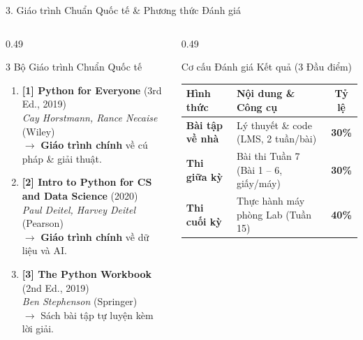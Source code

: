 \documentclass[aspectratio=169, 10pt]{beamer}
\begin{document}
\begin{frame}{3. Giáo trình Chuẩn Quốc tế \& Phương thức Đánh giá}
  \begin{columns}[T]
    \begin{column}{0.49\textwidth}
      \begin{cbox}[primaryblue]{3 Bộ Giáo trình Chuẩn Quốc tế}
        \footnotesize
        \begin{enumerate}\setlength{\itemsep}{3pt}
          \item \textbf{[1] Python for Everyone} (3rd Ed., 2019)\\
          \textit{Cay Horstmann, Rance Necaise} (Wiley)\\
          $\rightarrow$ \textbf{Giáo trình chính} về cú pháp \& giải thuật.
          \item \textbf{[2] Intro to Python for CS and Data Science} (2020)\\
          \textit{Paul Deitel, Harvey Deitel} (Pearson)\\
          $\rightarrow$ \textbf{Giáo trình chính} về dữ liệu và AI.
          \item \textbf{[3] The Python Workbook} (2nd Ed., 2019)\\
          \textit{Ben Stephenson} (Springer)\\
          $\rightarrow$ Sách bài tập tự luyện kèm lời giải.
        \end{enumerate}
      \end{cbox}
    \end{column}
    \begin{column}{0.49\textwidth}
      \begin{cbox}[secondarygreen]{Cơ cấu Đánh giá Kết quả (3 Đầu điểm)}
        \scriptsize
        \begin{tabularx}{\textwidth}{lX c}
          \toprule
          \textbf{Hình thức} & \textbf{Nội dung \& Công cụ} & \textbf{Tỷ lệ} \\
          \midrule
          \textbf{Bài tập về nhà} & Lý thuyết \& code (LMS, 2 tuần/bài) & \textbf{30\%} \\
          \textbf{Thi giữa kỳ} & Bài thi Tuần 7 (Bài 1 -- 6, giấy/máy) & \textbf{30\%} \\
          \textbf{Thi cuối kỳ} & Thực hành máy phòng Lab (Tuần 15) & \textbf{40\%} \\
          \bottomrule
        \end{tabularx}
      \end{cbox}
      \vspace{0.1cm}

\end{column}
\end{columns}
\end{frame}
\end{document}
